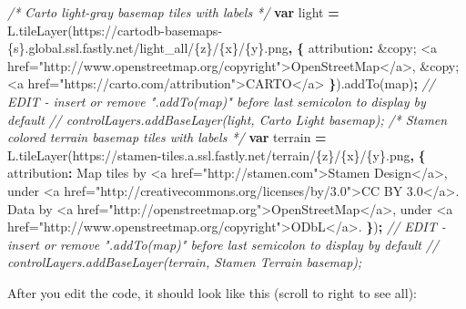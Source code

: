 \documentclass[
  english,
]{book}
\newenvironment{Shaded}{\begin{snugshade}}{\end{snugshade}}
\newcommand{\AttributeTok}[1]{\textcolor[rgb]{0.77,0.63,0.00}{#1}}
\newcommand{\CommentTok}[1]{\textcolor[rgb]{0.56,0.35,0.01}{\textit{#1}}}
\newcommand{\DataTypeTok}[1]{\textcolor[rgb]{0.13,0.29,0.53}{#1}}
\newcommand{\KeywordTok}[1]{\textcolor[rgb]{0.13,0.29,0.53}{\textbf{#1}}}
\newcommand{\NormalTok}[1]{#1}
\newcommand{\OperatorTok}[1]{\textcolor[rgb]{0.81,0.36,0.00}{\textbf{#1}}}
\newcommand{\StringTok}[1]{\textcolor[rgb]{0.31,0.60,0.02}{#1}}
\newcommand{\VariableTok}[1]{\textcolor[rgb]{0.00,0.00,0.00}{#1}}
\begin{document}
\begin{Shaded}
\begin{Highlighting}[]
\CommentTok{/* Carto light{-}gray basemap tiles with labels */}
  \KeywordTok{var}\NormalTok{ light }\OperatorTok{=} \VariableTok{L}\NormalTok{.}\AttributeTok{tileLayer}\NormalTok{(}\StringTok{\textquotesingle{}https://cartodb{-}basemaps{-}\{s\}.global.ssl.fastly.net/light\_all/\{z\}/\{x\}/\{y\}.png\textquotesingle{}}\OperatorTok{,} \OperatorTok{\{}
    \DataTypeTok{attribution}\OperatorTok{:} \StringTok{\textquotesingle{}\&copy; <a href="http://www.openstreetmap.org/copyright">OpenStreetMap</a>, \&copy; <a href="https://carto.com/attribution">CARTO</a>\textquotesingle{}}
  \OperatorTok{\}}\NormalTok{).}\AttributeTok{addTo}\NormalTok{(map)}\OperatorTok{;} \CommentTok{// EDIT {-} insert or remove ".addTo(map)" before last semicolon to display by default}
  \CommentTok{// controlLayers.addBaseLayer(light, \textquotesingle{}Carto Light basemap\textquotesingle{});}
  \CommentTok{/* Stamen colored terrain basemap tiles with labels */}
  \KeywordTok{var}\NormalTok{ terrain }\OperatorTok{=} \VariableTok{L}\NormalTok{.}\AttributeTok{tileLayer}\NormalTok{(}\StringTok{\textquotesingle{}https://stamen{-}tiles.a.ssl.fastly.net/terrain/\{z\}/\{x\}/\{y\}.png\textquotesingle{}}\OperatorTok{,} \OperatorTok{\{}
    \DataTypeTok{attribution}\OperatorTok{:} \StringTok{\textquotesingle{}Map tiles by <a href="http://stamen.com">Stamen Design</a>, under <a href="http://creativecommons.org/licenses/by/3.0">CC BY 3.0</a>. Data by <a href="http://openstreetmap.org">OpenStreetMap</a>, under <a href="http://www.openstreetmap.org/copyright">ODbL</a>.\textquotesingle{}}
  \OperatorTok{\}}\NormalTok{)}\OperatorTok{;} \CommentTok{// EDIT {-} insert or remove ".addTo(map)" before last semicolon to display by default}
  \CommentTok{// controlLayers.addBaseLayer(terrain, \textquotesingle{}Stamen Terrain basemap\textquotesingle{});}
\end{Highlighting}
\end{Shaded}

After you edit the code, it should look like this (scroll to right to see all):
\end{document}

